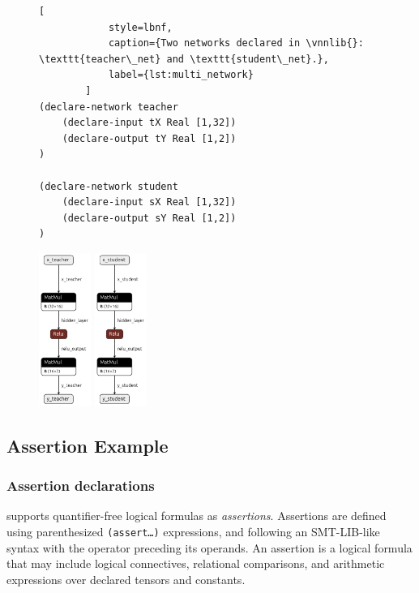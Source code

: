 \begin{figure}[h!]
    \begin{minipage}[c]{0.6\textwidth}
        \begin{lstlisting}[
            style=lbnf,
            caption={Two networks declared in \vnnlib{}: \texttt{teacher\_net} and \texttt{student\_net}.},
            label={lst:multi_network}
        ]
(declare-network teacher
    (declare-input tX Real [1,32])
    (declare-output tY Real [1,2])
)

(declare-network student
    (declare-input sX Real [1,32])
    (declare-output sY Real [1,2])
)
        \end{lstlisting}
    \end{minipage}
    \begin{minipage}[c]{0.4\textwidth}
        \centering
        \includegraphics[height=5cm]{imgs/teacher_net.onnx.png}
        \vspace{0.5cm} 
        \includegraphics[height=5cm]{imgs/student_net.onnx.png}
    \end{minipage}
\end{figure}

\subsection{Assertion Example}

\subsubsection*{Assertion declarations}
\label{sec:assertion-declarations}
\vnnlib{} supports quantifier-free logical formulas as \textit{assertions}. Assertions are defined using parenthesized \texttt{(assert\ldots)} expressions, and following an SMT-LIB-like syntax with the 
operator preceding its operands. An assertion is a logical formula that may include logical connectives, relational comparisons, and arithmetic expressions over declared tensors and constants.

